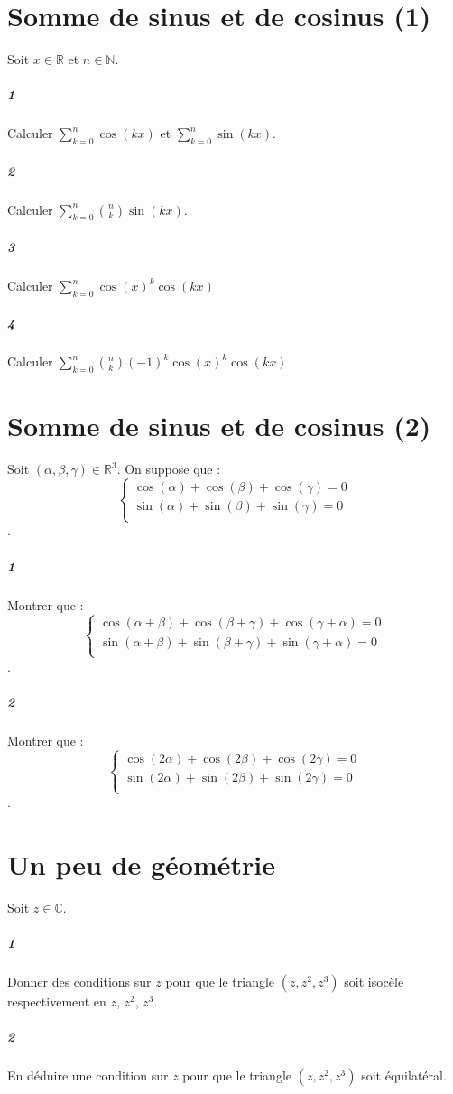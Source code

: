 \documentclass[10pt,a4paper]{article}
\begin{document}
\section{Somme de sinus et de cosinus (1)}
Soit $x \in \mathbb{R}$ et $n \in \mathbb{N}$.
\subparagraph{1}Calculer $\sum_{k=0}^n \cos(kx)$ et $\sum_{k=0}^n \sin(kx)$.
\subparagraph{2}Calculer $\sum_{k=0}^n {n \choose k}  \sin(kx)$.
\subparagraph{3}Calculer $\sum_{k=0}^n \cos(x)^k  \cos(kx)$
\subparagraph{4}Calculer $\sum_{k=0}^n {n \choose k} (-1)^k \cos(x)^k  \cos(kx)$

\section{Somme de sinus et de cosinus (2)}
Soit $(\alpha,\beta,\gamma) \in \mathbb{R}^3$. On suppose que :
\begin{equation*}
\left\{
\begin{aligned}
\cos(\alpha)+\cos(\beta)+\cos(\gamma)=0\\
\sin(\alpha)+\sin(\beta)+\sin(\gamma)=0\\
\end{aligned}
\right.
\end{equation*}.
\subparagraph{1}Montrer que :
\begin{equation*}
\left\{
\begin{aligned}
\cos(\alpha+\beta)+\cos(\beta+\gamma)+\cos(\gamma+\alpha)=0\\
\sin(\alpha+\beta)+\sin(\beta+\gamma)+\sin(\gamma+\alpha)=0\\
\end{aligned}
\right.
\end{equation*}.
\subparagraph{2}Montrer que :
\begin{equation*}
\left\{
\begin{aligned}
\cos(2\alpha)+\cos(2\beta)+\cos(2\gamma)=0\\
\sin(2\alpha)+\sin(2\beta)+\sin(2\gamma)=0\\
\end{aligned}
\right.
\end{equation*}.

\section{Un peu de géométrie}
Soit $z \in \mathbb{C}$.
\subparagraph{1}Donner des conditions sur $z$ pour que le triangle $(z,z^2,z^3)$ soit isocèle respectivement en $z$, $z^2$, $z^3$.
\subparagraph{2}En déduire une condition sur $z$ pour que le triangle $(z,z^2,z^3)$ soit équilatéral.
\end{document}
